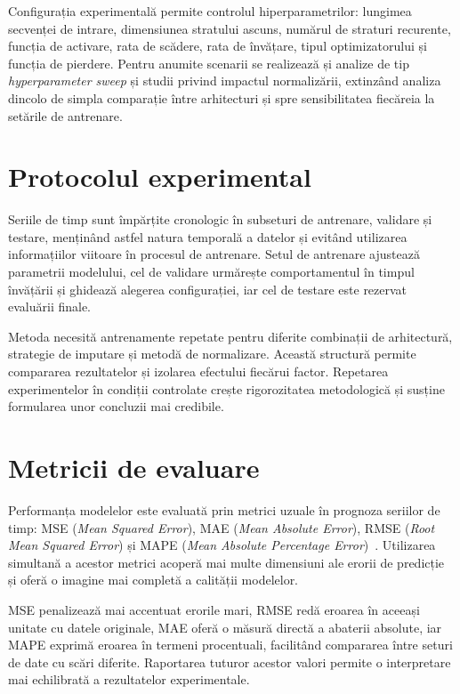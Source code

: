Configurația experimentală permite controlul hiperparametrilor: lungimea secvenței de intrare, dimensiunea stratului ascuns, numărul de straturi recurente, funcția de activare, rata de scădere, rata de învățare, tipul optimizatorului și funcția de pierdere. Pentru anumite scenarii se realizează și analize de tip \textit{hyperparameter sweep} și studii privind impactul normalizării, extinzând analiza dincolo de simpla comparație între arhitecturi și spre sensibilitatea fiecăreia la setările de antrenare.
\section{Protocolul experimental}

Seriile de timp sunt împărțite cronologic în subseturi de antrenare, validare și testare, menținând astfel natura temporală a datelor și evitând utilizarea informațiilor viitoare în procesul de antrenare. Setul de antrenare ajustează parametrii modelului, cel de validare urmărește comportamentul în timpul învățării și ghidează alegerea configurației, iar cel de testare este rezervat evaluării finale.

Metoda necesită antrenamente repetate pentru diferite combinații de arhitectură, strategie de imputare și metodă de normalizare. Această structură permite compararea rezultatelor și izolarea efectului fiecărui factor. Repetarea experimentelor în condiții controlate crește rigorozitatea metodologică și susține formularea unor concluzii mai credibile.

\section{Metricii de evaluare}

Performanța modelelor este evaluată prin metrici uzuale în prognoza seriilor de timp: MSE (\textit{Mean Squared Error}), MAE (\textit{Mean Absolute Error}), RMSE (\textit{Root Mean Squared Error}) și MAPE (\textit{Mean Absolute Percentage Error})~\cite{hyndman2021fpp3, makridakis2018m4}. Utilizarea simultană a acestor metrici acoperă mai multe dimensiuni ale erorii de predicție și oferă o imagine mai completă a calității modelelor.

MSE penalizează mai accentuat erorile mari, RMSE redă eroarea în aceeași unitate cu datele originale, MAE oferă o măsură directă a abaterii absolute, iar MAPE exprimă eroarea în termeni procentuali, facilitând compararea între seturi de date cu scări diferite. Raportarea tuturor acestor valori permite o interpretare mai echilibrată a rezultatelor experimentale.

